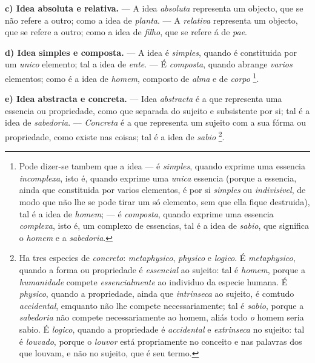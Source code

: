 \textbf{c) Idea absoluta e relativa.} --- A idea \emph{absoluta} representa um objecto, que se não refere a outro; como a idea de \emph{planta}. --- A \emph{relativa} representa um objecto, que se refere a outro; como a idea de \emph{filho}, que se refere á de \emph{pae}.

\textbf{d) Idea simples e composta.} --- A idea é \emph{simples}, quando é constituida por um \emph{unico} elemento; tal a idea de \emph{ente}. --- É   \emph{composta}, quando abrange \emph{varios} elementos; como é a idea de \emph{homem}, composto de \emph{alma} e de \emph{corpo} \footnote{Pode dizer-se tambem que a idea --- é \emph{simples}, quando exprime uma essencia \emph{incomplexa}, isto é, quando exprime uma \emph{unica} essencia (porque a essencia, ainda que constituida por varios elementos, é por si \emph{simples} ou \emph{indivisivel}, de modo que não lhe se pode tirar um só elemento, sem que ella fique destruida), tal é a idea de \emph{homem}; --- é \emph{composta}, quando exprime uma essencia \emph{complexa}, isto é, um complexo de essencias, tal é a idea de \emph{sabio}, que significa o \emph{homem} e a \emph{sabedoria}.}.

\textbf{e) Idea abstracta e concreta.} --- Idea \emph{abstracta} é a que representa uma essencia ou propriedade, como que separada do sujeito e subsistente por si; tal é a idea de \emph{sabedoria}. --- \emph{Concreta} é a que representa um sujeito com a sua fórma ou propriedade, como existe nas coisas; tal é a idea de \emph{sabio} \footnote{Ha tres especies de \emph{concreto}: \emph{metaphysico}, \emph{physico} e \emph{logico}. É \emph{metaphysico}, quando a forma ou propriedade é \emph{essencial} ao sujeito: tal é \emph{homem}, porque a \emph{humanidade} compete \emph{essencialmente} ao individuo da especie humana. É \emph{physico}, quando a propriedade, ainda que \emph{intrinseca} ao sujeito, é comtudo \emph{accidental}, emquanto não lhe compete necessariamente; tal é \emph{sabio}, porque a \emph{sabedoria} não compete necessariamente ao homem, aliás todo \emph{o} homem seria sabio. É \emph{logico}, quando a propriedade é \emph{accidental} e \emph{extrinseca} no sujeito: tal é \emph{louvado}, porque o \emph{louvor} está propriamente no conceito e nas palavras dos que louvam, e não no sujeito, que é seu termo.}.

